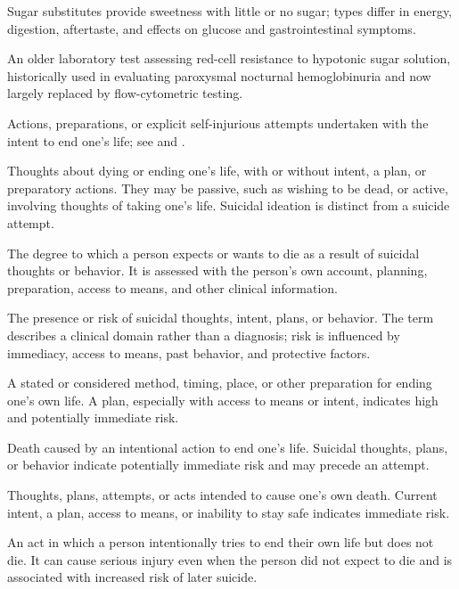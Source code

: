  Sugar substitutes provide sweetness with little or no sugar; types differ in energy, digestion, aftertaste, and effects on glucose and gastrointestinal symptoms.

 An older laboratory test assessing red-cell resistance to hypotonic sugar solution, historically used in evaluating paroxysmal nocturnal hemoglobinuria and now largely replaced by flow-cytometric testing.

 Actions, preparations, or explicit self-injurious attempts undertaken with the intent to end one's life; see  and .

 Thoughts about dying or ending one's life, with or without intent, a plan, or preparatory actions.
They may be passive, such as wishing to be dead, or active, involving thoughts of taking one's life.
Suicidal ideation is distinct from a suicide attempt.

 The degree to which a person expects or wants to die as a result of suicidal thoughts or behavior. It is assessed with the person’s own account, planning, preparation, access to means, and other clinical information.

 The presence or risk of suicidal thoughts, intent, plans, or behavior. The term describes a clinical domain rather than a diagnosis; risk is influenced by immediacy, access to means, past behavior, and protective factors.

 A stated or considered method, timing, place, or other preparation for ending one’s own life. A plan, especially with access to means or intent, indicates high and potentially immediate risk.

 Death caused by an intentional action to end one's life. Suicidal thoughts, plans, or behavior indicate potentially immediate risk and may precede an attempt.

 Thoughts, plans, attempts, or acts intended to cause one’s own death. Current intent, a plan, access to means, or inability to stay safe indicates immediate risk.

 An act in which a person intentionally tries to end their own life but does not die. It can cause serious injury even when the person did not expect to die and is associated with increased risk of later suicide.

